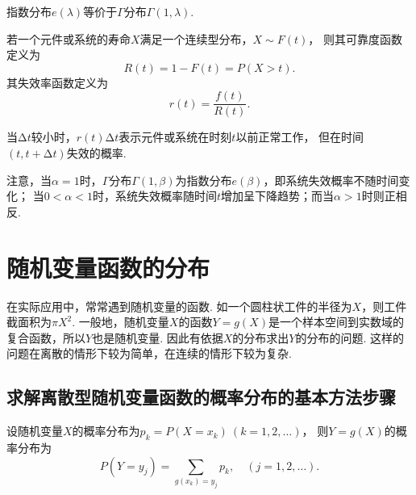 指数分布\(e(\lambda)\)等价于\(\Gamma\)分布\(\Gamma(1,\lambda)\).

\begin{definition}
若一个元件或系统的寿命\(X\)满足一个连续型分布，\(X \sim F(t)\)，%
则其可靠度函数定义为\[
R(t) = 1 - F(t) = P(X > t).
\]其失效率函数定义为\[
r(t) = \frac{f(t)}{R(t)}.
\]

当\(\increment t\)较小时，\(r(t) \increment t\)表示元件或系统在时刻\(t\)以前正常工作，%
但在时间\((t,t+\increment t)\)失效的概率.
\end{definition}

注意，当\(\alpha = 1\)时，\(\Gamma\)分布\(\Gamma(1,\beta)\)为指数分布\(e(\beta)\)，即系统失效概率不随时间变化；
当\(0 < \alpha < 1\)时，系统失效概率随时间\(t\)增加呈下降趋势；而当\(\alpha > 1\)时则正相反.

\section{随机变量函数的分布}
在实际应用中，常常遇到随机变量的函数.
如一个圆柱状工件的半径为\(X\)，则工件截面积为\(\pi X^2\).
一般地，随机变量\(X\)的函数\(Y=g(X)\)是一个样本空间到实数域的复合函数，所以\(Y\)也是随机变量.
因此有依据\(X\)的分布求出\(Y\)的分布的问题.
这样的问题在离散的情形下较为简单，在连续的情形下较为复杂.

\subsection{求解离散型随机变量函数的概率分布的基本方法步骤}
设随机变量\(X\)的概率分布为\(p_k = P(X = x_k)\ (k=1,2,\dotsc)\)，%
则\(Y = g(X)\)的概率分布为\[
P(Y = y_j) = \sum\limits_{g(x_k) = y_j} p_k,
\quad(j=1,2,\dotsc).
\]

